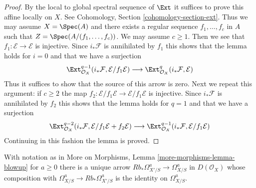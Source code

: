 \begin{proof}
By the local to global spectral sequence of $\Ext$ it suffices
to prove this affine locally on $X$. See
Cohomology, Section \ref{cohomology-section-ext}.
Thus we may assume $X = \Spec(A)$
and there exists a regular sequence $f_1, \ldots, f_c$ in $A$
such that $Z = \Spec(A/(f_1, \ldots, f_c))$. We may assume $c \geq 1$.
Then we see that $f_1 : \mathcal{E} \to \mathcal{E}$
is injective. Since $i_*\mathcal{F}$ is annihilated by $f_1$
this shows that the lemma holds for $i = 0$ and that we have
a surjection
$$
\Ext^{q - 1}_{\mathcal{O}_X}(i_*\mathcal{F}, \mathcal{E}/f_1\mathcal{E})
\longrightarrow
\Ext^q_{\mathcal{O}_X}(i_*\mathcal{F}, \mathcal{E})
$$
Thus it suffices to show that the source of this arrow is zero.
Next we repeat this argument: if $c \geq 2$ the map
$f_2 : \mathcal{E}/f_1\mathcal{E} \to \mathcal{E}/f_1\mathcal{E}$
is injective. Since $i_*\mathcal{F}$ is annihilated by $f_2$
this shows that the lemma holds for $q = 1$ and that we have a
surjection
$$
\Ext^{q - 2}_{\mathcal{O}_X}(i_*\mathcal{F},
\mathcal{E}/f_1\mathcal{E} + f_2\mathcal{E})
\longrightarrow
\Ext^{q - 1}_{\mathcal{O}_X}(i_*\mathcal{F}, \mathcal{E}/f_1\mathcal{E})
$$
Continuing in this fashion the lemma is proved.
\end{proof}

\begin{lemma}
\label{lemma-splitting-on-omega-a}
With notation as in More on Morphisms, Lemma \ref{more-morphisms-lemma-blowup}
for $a \geq 0$ there is a unique arrow
$Rb_*\Omega^a_{X'/S} \to \Omega^a_{X/S}$ in $D(\mathcal{O}_X)$
whose composition with $\Omega^a_{X/S} \to Rb_*\Omega^a_{X'/S}$
is the identity on $\Omega^a_{X/S}$.
\end{lemma}

